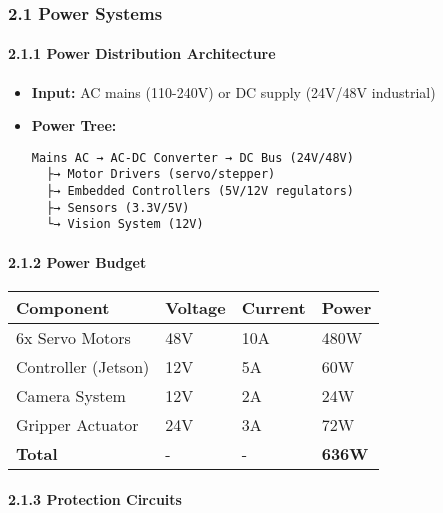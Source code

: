 \documentclass[
]{article}
\begin{document}
\hypertarget{power-systems}{%
\subsubsection{2.1 Power Systems}\label{power-systems}}

\hypertarget{power-distribution-architecture}{%
\paragraph{2.1.1 Power Distribution
Architecture}\label{power-distribution-architecture}}

\begin{itemize}
\item
  \textbf{Input:} AC mains (110-240V) or DC supply (24V/48V industrial)
\item
  \textbf{Power Tree:}

\begin{verbatim}
Mains AC → AC-DC Converter → DC Bus (24V/48V)
  ├→ Motor Drivers (servo/stepper)
  ├→ Embedded Controllers (5V/12V regulators)
  ├→ Sensors (3.3V/5V)
  └→ Vision System (12V)
\end{verbatim}
\end{itemize}

\hypertarget{power-budget}{%
\paragraph{2.1.2 Power Budget}\label{power-budget}}

\begin{longtable}[]{@{}llll@{}}
\toprule\noalign{}
Component & Voltage & Current & Power \\
\midrule\noalign{}
\endhead
\bottomrule\noalign{}
\endlastfoot
6x Servo Motors & 48V & 10A & 480W \\
Controller (Jetson) & 12V & 5A & 60W \\
Camera System & 12V & 2A & 24W \\
Gripper Actuator & 24V & 3A & 72W \\
\textbf{Total} & - & - & \textbf{636W} \\
\end{longtable}

\hypertarget{protection-circuits}{%
\paragraph{2.1.3 Protection Circuits}\label{protection-circuits}}
\end{document}
